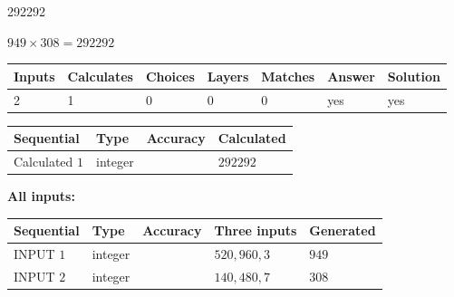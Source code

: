 \documentclass{ctexart}
\begin{document}
 
 
\noindent{}
 
 

292292
 
 
\noindent{}
 
 

 
 
 
\noindent{}
 
 

$ %
949 \times  %
308=   %
292292$
 
 
\noindent{}
 
 

 
   
   
   
   
\noindent\begin{tabular}{|l|l|l|l|l|l|l|}
 \hline
Inputs & Calculates & Choices & Layers & Matches & Answer & Solution \\ \hline
 2  & 
 1  & 
 0
  & 
 0  & 
 0  & 
  yes & 
  yes 
  \\ \hline
 \end{tabular}
   
   
   
   
\noindent{}
   
   
  
  
\noindent\begin{tabular}{|l|l|l|l|}
\hline
 Sequential & Type & Accuracy & Calculated \\ 
\hline
 
 
  Calculated $  1 $ & integer &  & 
  $ 292292 $ 
 \\  \hline  
 \end{tabular}
   
   
   
   
\noindent\vspace{0.1in}\hspace{-0.08in} {\textbf{\Large{All inputs: }}}
   
   
  
  
\noindent\begin{tabular}{|l|l|l|l|l|}
\hline
 Sequential & Type & Accuracy & Three inputs & Generated \\ 
\hline
 
 
  INPUT $  1 $ & integer &  & $
 520
 , 
 960
 , 
 3
 $ & $ 949 $ 
 \\  \hline  
 
 
  INPUT $  2 $ & integer &  & $
 140
 , 
 480
 , 
 7
 $ & $ 308 $ 
 \\  \hline  
 \end{tabular}
   
\end{document}
